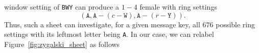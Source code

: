 window setting of \texttt{BWY} can produce a $1-4$ female with ring settings
\[
  (\texttt{A}, \texttt{A} - (c -\texttt{W}), \texttt{A} - (r -\texttt{Y})).
\]
Thus, such a sheet can investigate, for a given message key, all $676$
possible ring settings with its leftmost letter being \texttt{A}. In
our case, we can relabel Figure~\ref{fig:zygalski_sheet} as follows
\begin{figure}[H]
  \begin{center}
\end{center}
\end{figure}
